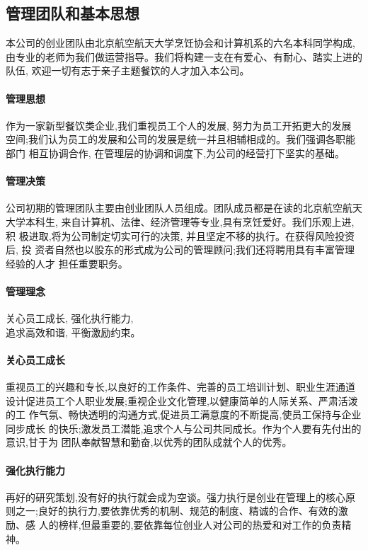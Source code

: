 \subsection{管理团队和基本思想}
本公司的创业团队由北京航空航天大学烹饪协会和计算机系的六名本科同学构成,
由专业的老师为我们做运营指导。我们将构建一支在有爱心、有耐心、踏实上进的队伍,
欢迎一切有志于亲子主题餐饮的人才加入本公司。

\paragraph{管理思想}
作为一家新型餐饮类企业,我们重视员工个人的发展, 努力为员工开拓更大的发展
空间;我们认为员工的发展和公司的发展是统一并且相辅相成的。我们强调各职能部门
相互协调合作, 在管理层的协调和调度下,为公司的经营打下坚实的基础。

\paragraph{管理决策}
公司初期的管理团队主要由创业团队人员组成。团队成员都是在读的北京航空航天
大学本科生, 来自计算机、法律、经济管理等专业,具有烹饪爱好。我们乐观上进,积
极进取,将为公司制定切实可行的决策, 并且坚定不移的执行。在获得风险投资后, 投
资者自然也以股东的形式成为公司的管理顾问;我们还将聘用具有丰富管理经验的人才
担任重要职务。

\paragraph{管理理念}
\begin{center}
        关心员工成长, 强化执行能力,\\
        追求高效和谐, 平衡激励约束。
\end{center}

\paragraph{关心员工成长}
重视员工的兴趣和专长,以良好的工作条件、完善的员工培训计划、职业生涯通道
设计促进员工个人职业发展;重视企业文化管理,以健康简单的人际关系、严肃活泼的工
作气氛、畅快透明的沟通方式,促进员工满意度的不断提高,使员工保持与企业同步成长
的快乐;激发员工潜能,追求个人与公司共同成长。作为个人要有先付出的意识,甘于为
团队奉献智慧和勤奋,以优秀的团队成就个人的优秀。

\paragraph{强化执行能力}
再好的研究策划,没有好的执行就会成为空谈。强力执行是创业在管理上的核心原
则之一;良好的执行力,要依靠优秀的机制、规范的制度、精诚的合作、有效的激励、感
人的榜样,但最重要的,要依靠每位创业人对公司的热爱和对工作的负责精神。

